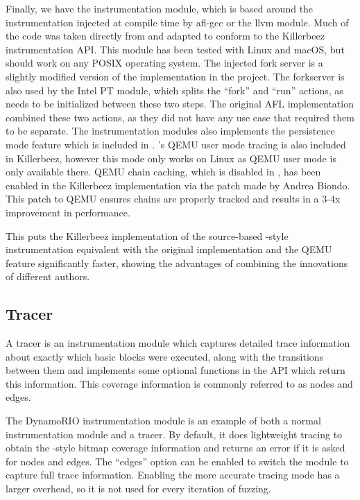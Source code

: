 Finally, we have the \AFL{} instrumentation module, which is based around the
instrumentation injected at compile time by afl-gcc or the \AFL{}
llvm module. Much of the code was taken directly from \AFL{} and adapted to
conform to the Killerbeez instrumentation API. This module has been tested
with Linux and macOS, but should work on any POSIX operating system.
The injected fork server is a slightly modified version of the
implementation in the \AFL{} project. The forkserver is also used by the
Intel PT module, which splits the ``fork'' and ``run'' actions, as \IPT{} needs
to be initialized between these two steps.  The original AFL implementation
combined these two actions, as they did not have any use case that required
them to be separate.  The \AFL{} instrumentation modules also
implements the persistence mode feature
which is included in \AFL{}.  \AFL{}'s QEMU user mode tracing is also included in Killerbeez,
however this mode only works on Linux as QEMU user mode is only
available there.  QEMU chain caching, which is disabled in \AFL{},
has been enabled in the Killerbeez implementation via the patch made by Andrea Biondo.\cite{qemuspeedup} This patch
to QEMU ensures chains are properly tracked and results in a 3-4x improvement
in performance.

This puts the Killerbeez implementation of the source-based \AFL{}-style
instrumentation equivalent with the original implementation and the QEMU
feature significantly faster, showing the advantages of combining the
innovations of different authors.

\subsection{Tracer} \label{Tracer}
A tracer is an instrumentation module which captures detailed trace
information about exactly which basic blocks were executed, along with the
transitions between them and implements some optional functions in the API
which return this information.  This coverage information is commonly referred
to as nodes and edges.

The DynamoRIO instrumentation module is an example of both a normal
instrumentation module and a tracer. By default, it does lightweight tracing to
obtain the \AFL{}-style bitmap coverage information and returns an error if it
is asked for nodes and edges. The ``edges'' option can be enabled to
switch the module to capture full trace information.
Enabling the more accurate tracing mode has a larger overhead, so it is not
used for every iteration of fuzzing.

